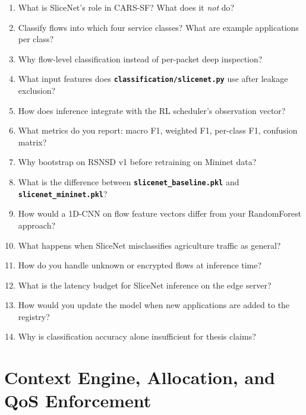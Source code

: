 \documentclass[11pt,a4paper]{article}
\newcommand{\proj}[1]{\textbf{\texttt{#1}}}
\begin{document}
\begin{enumerate}
    \item What is SliceNet's role in CARS-SF? What does it \emph{not} do?
    \item Classify flows into which four service classes? What are example applications per class?
    \item Why flow-level classification instead of per-packet deep inspection?
    \item What input features does \proj{classification/slicenet.py} use after leakage exclusion?
    \item How does inference integrate with the RL scheduler's observation vector?
    \item What metrics do you report: macro F1, weighted F1, per-class F1, confusion matrix?
    \item Why bootstrap on RSNSD v1 before retraining on Mininet data?
    \item What is the difference between \proj{slicenet\_baseline.pkl} and \proj{slicenet\_mininet.pkl}?
    \item How would a 1D-CNN on flow feature vectors differ from your RandomForest approach?
    \item What happens when SliceNet misclassifies agriculture traffic as general?
    \item How do you handle unknown or encrypted flows at inference time?
    \item What is the latency budget for SliceNet inference on the edge server?
    \item How would you update the model when new applications are added to the registry?
    \item Why is classification accuracy alone insufficient for thesis claims?
\end{enumerate}

\section{Context Engine, Allocation, and QoS Enforcement}
\end{document}
